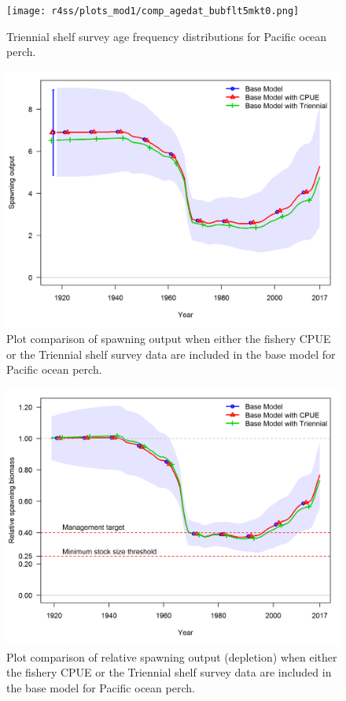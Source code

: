\documentclass[12pt,]{article}
\begin{document}
\FloatBarrier

\begin{figure}
\centering
\texttt{[image: r4ss/plots\_mod1/comp\_agedat\_bubflt5mkt0.png]}
\caption{Triennial shelf survey age frequency distributions for Pacific
ocean perch. \label{fig:Tri_Age}}
\end{figure}

\FloatBarrier

\begin{figure}
\centering
\includegraphics{Figures/ExcludedData_ssb.png}
\caption{Plot comparison of spawning output when either the fishery CPUE
or the Triennial shelf survey data are included in the base model for
Pacific ocean perch. \label{fig:Excluded_Data_ssb}}
\end{figure}

\FloatBarrier

\begin{figure}
\centering
\includegraphics{Figures/ExcludedData_depl.png}
\caption{Plot comparison of relative spawning output (depletion) when
either the fishery CPUE or the Triennial shelf survey data are included
in the base model for Pacific ocean perch.
\label{fig:Excluded_Data_depl}}
\end{figure}
\end{document}
